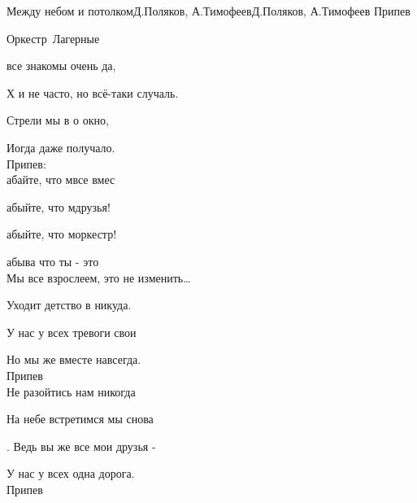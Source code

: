 \documentclass[11pt,a5paper]{book}
\renewcommand{\tt}{\indent \indent}
\begin{document}
\begin{song}{Между небом и потолком}{}{Д.Поляков, А.Тимофеев}{Д.Поляков, А.Тимофеев}{}{}
Припев\\

\begin{SBSection*}
\begin{figure}[b!]
\end{figure}
\end{SBSection*}
\end{song}

\begin{song}{Оркестр}{}{~}{Лагерные}{}{}

 все знакомы очень да,\par
Х и не часто, но всё-таки случаль.\par
Стрели мы в о окно,\par
Иогда даже получало.\\

Припев:\\
абайте, что мвсе вмес\par
{}абыйте, что мдрузья!  \par
{}абыйте, что моркестр! \par
{}абыва что ты - это \\

Мы все взрослеем, это не изменить…\par
Уходит детство в никуда.\par
У нас у всех тревоги свои\par
Но мы же вместе навсегда.\\

Припев\\

Не разойтись нам никогда\par
На небе встретимся мы снова\par.
Ведь вы же все мои друзья - \par
У нас у всех одна дорога.\\

Припев\\
\end{song}
\end{document}
